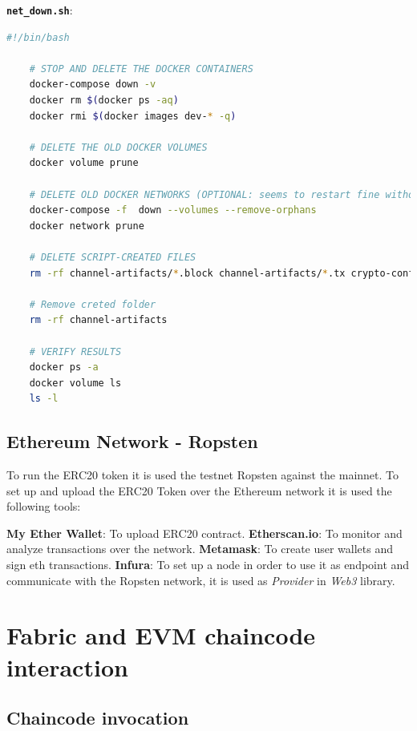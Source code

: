 \bigskip

\textbf{\texttt{net\_down.sh}}:

\begin{lstlisting}[language=bash]
    #!/bin/bash

    # STOP AND DELETE THE DOCKER CONTAINERS
    docker-compose down -v
    docker rm $(docker ps -aq)
    docker rmi $(docker images dev-* -q)

    # DELETE THE OLD DOCKER VOLUMES
    docker volume prune

    # DELETE OLD DOCKER NETWORKS (OPTIONAL: seems to restart fine without)
    docker-compose -f  down --volumes --remove-orphans
    docker network prune

    # DELETE SCRIPT-CREATED FILES
    rm -rf channel-artifacts/*.block channel-artifacts/*.tx crypto-config

    # Remove creted folder
    rm -rf channel-artifacts

    # VERIFY RESULTS
    docker ps -a
    docker volume ls
    ls -l
\end{lstlisting}

\subsection{Ethereum Network - Ropsten}

To run the ERC20 token it is used the testnet Ropsten against the mainnet. 
To set up and upload the ERC20 Token over the Ethereum network it is used the following tools:

\begin{outline}
    \1 \textbf{My Ether Wallet}: To upload ERC20 contract.
    \1 \textbf{Etherscan.io}: To monitor and analyze transactions over the network.
    \1 \textbf{Metamask}: To create user wallets and sign eth transactions.
    \1 \textbf{Infura}: To set up a node in order to use it as endpoint and communicate with the Ropsten network,
    it is used as \textit{Provider} in \textit{Web3} library.  
\end{outline}

\section{Fabric and EVM chaincode interaction}

\subsection{Chaincode invocation}

